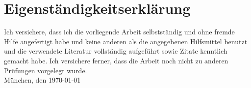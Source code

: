 \documentclass[12pt, a4paper]{article}
\newcommand*{\getSubmissionDate}{\today}
\begin{document}
\newpage
\section{Eigenständigkeitserklärung}
Ich versichere, dass ich die vorliegende Arbeit selbstständig und ohne fremde Hilfe angefertigt habe und keine anderen als die angegebenen Hilfsmittel benutzt und die verwendete Literatur vollständig aufgeführt sowie Zitate kenntlich gemacht habe. Ich versichere ferner, dass die Arbeit noch nicht zu anderen Prüfungen vorgelegt wurde. \\

München, den \getSubmissionDate

\end{document}
